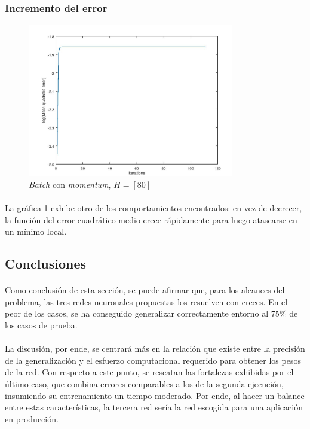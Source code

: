 \documentclass[12pt, twocolumn]{article}
\begin{document}
	\subsubsection{Incremento del error}
	
	\begin{figure}[H]
		\centering
		\includegraphics[width=9cm]{../results/other_architectures/batch_momentum_80/b_m_80.jpg}
		\caption{\textit{Batch} con \textit{momentum}, $H = \left[80\right]$}
		\label{bm80}
	\end{figure}
	
	\paragraph{} La gráfica \ref{bm80} exhibe otro de los comportamientos encontrados: en vez de decrecer, la función del error cuadrático medio crece rápidamente para luego atascarse en un mínimo local. 
	
	\subsection{Conclusiones}
	
	\paragraph{} Como conclusión de esta sección, se puede afirmar que, para los alcances del problema, las tres redes neuronales propuestas los resuelven con creces. En el peor de los casos, se ha conseguido generalizar correctamente entorno al $75\%$ de los casos de prueba.
	
	\paragraph{} La discusión, por ende, se centrará más en la relación que existe entre la precisión de la generalización y el esfuerzo computacional requerido para obtener los pesos de la red. Con respecto a este punto, se rescatan las fortalezas exhibidas por el último caso, que combina errores comparables a los de la segunda ejecución, insumiendo su entrenamiento un tiempo moderado. Por ende, al hacer un balance entre estas características, la tercera red sería la red escogida para una aplicación en producción.
	
\end{document}
